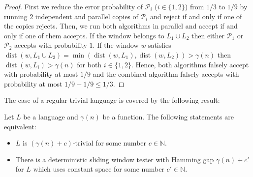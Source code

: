\documentclass{theoretics}
\newcommand{\N}{\mathbb{N}}
\renewcommand{\P}{\mathcal{P}}
\DeclareMathOperator{\dist}{dist}
\renewcommand{\leq}{\leqslant}
\begin{document}
\begin{proof}
First we reduce the error probability of $\P_i$ ($i \in \{ 1,2\}$) from $1/3$ to $1/9$ 
by running $2$ independent and parallel
copies of $\P_i$ and reject if and only if one of the copies rejects. 
Then, we run both algorithms in parallel and accept if and only if one of them accepts.
If the window belongs to $L_1 \cup L_2$ then either $\P_1$ or $\P_2$ accepts with probability $1$.
If the window $w$ satisfies $\dist(w,L_1 \cup L_2)  = \min(\dist(w,L_1), \dist(w,L_2)) > \gamma(n)$
then $\dist(w,L_i) > \gamma(n)$ for both $i \in \{1,2\}$.
Hence, both algorithms falsely accept with probability at most $1/9$ and the combined 
algorithm falsely accepts with probability at most $1/9 + 1/9 \leq 1/3$.
\end{proof}
The case of a regular trivial language is covered by the following result:
\begin{theorem}
\label{prop-trivial1}
Let $L$ be a language and $\gamma(n)$ be a function. The following statements are equivalent:
\begin{itemize}
\item $L$ is $(\gamma(n)+c)$-trivial for some number $c \in \N$.
\item There is a deterministic sliding window tester
with Hamming gap $\gamma(n)+c'$ for $L$ which uses constant space for some number $c' \in \N$.
\end{itemize}
\end{theorem}
\end{document}
